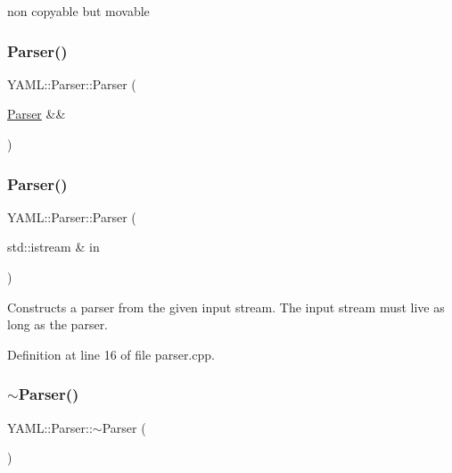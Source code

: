 non copyable but movable \mbox{\label{class_y_a_m_l_1_1_parser_a49484a840b41e33f667cf1a8b38d14f9}} 
\subsubsection{\texorpdfstring{Parser()}{Parser()}\hspace{0.1cm}{\footnotesize\ttfamily [3/4]}}
{\footnotesize\ttfamily Y\+A\+M\+L\+::\+Parser\+::\+Parser (\begin{DoxyParamCaption}\item[{\mbox{\hyperlink{class_y_a_m_l_1_1_parser}{Parser}} \&\&}]{ }\end{DoxyParamCaption})\hspace{0.3cm}{\ttfamily [default]}}

\mbox{\label{class_y_a_m_l_1_1_parser_a48fa032c51c491baa16738c4340b20e8}} 
\subsubsection{\texorpdfstring{Parser()}{Parser()}\hspace{0.1cm}{\footnotesize\ttfamily [4/4]}}
{\footnotesize\ttfamily Y\+A\+M\+L\+::\+Parser\+::\+Parser (\begin{DoxyParamCaption}\item[{std\+::istream \&}]{in }\end{DoxyParamCaption})\hspace{0.3cm}{\ttfamily [explicit]}}

Constructs a parser from the given input stream. The input stream must live as long as the parser. 

Definition at line 16 of file parser.\+cpp.

\mbox{\label{class_y_a_m_l_1_1_parser_ab901da63c58009ce94635dd6150e574f}} 
\subsubsection{\texorpdfstring{$\sim$Parser()}{~Parser()}}
{\footnotesize\ttfamily Y\+A\+M\+L\+::\+Parser\+::$\sim$\+Parser (\begin{DoxyParamCaption}{ }\end{DoxyParamCaption})}



